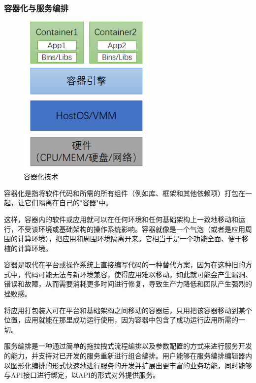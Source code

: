 \subsubsection{容器化与服务编排}

\begin{figure}[H]
    \centering
    \includegraphics[width=0.6\textwidth, height=0.4\textheight]{Img/container.png}
    \caption{容器化技术}
    \label{fig:container}
\end{figure}

容器化是指将软件代码和所需的所有组件（例如库、框架和其他依赖项）打包在一起，让它们隔离在自己的"容器"中。\par

这样，容器内的软件或应用就可以在任何环境和任何基础架构上一致地移动和运行，不受该环境或基础架构的操作系统影响。容器就像是一个气泡（或者是应用周围的计算环境），把应用和周围环境隔离开来。它相当于是一个功能全面、便于移植的计算环境。\par

容器是取代在平台或操作系统上直接编写代码的一种替代方案，因为在这种旧的方式中，代码可能无法与新环境兼容，使得应用难以移动。如此就可能会产生漏洞、错误和故障，从而需要消耗更多时间进行修复，导致生产力降低和团队产生强烈的挫败感。\par

将应用打包装入可在平台和基础架构之间移动的容器后，只用把该容器移动到某个位置，应用就能在那里成功运行使用，因为容器中包含了成功运行应用所需的一切。\par

服务编排是一种通过简单的拖拉拽式流程编排以及参数配置的方式来进行服务开发的能力，并支持对已开发的服务重新进行组合编排。用户能够在服务编排编辑器内以图形化编排的形式快速地进行服务的开发并扩展出更丰富的业务功能，同时能够与API接口进行绑定，以API的形式对外提供服务。

